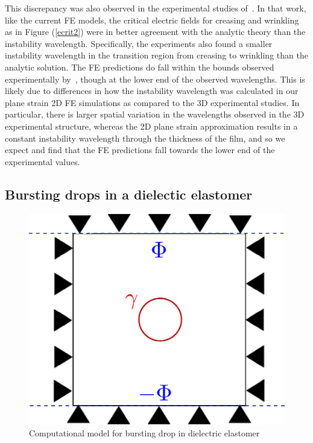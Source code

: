 \documentclass[final,authoryear,3p,times]{elsarticle}
\begin{document}
This discrepancy was also observed in the experimental studies of~\citet{wangPRE2013}.  In that work, like the current FE models, the critical electric fields for creasing and wrinkling as in Figure (\ref{ecrit2}) were in better agreement with the analytic theory than the instability wavelength.  Specifically, the experiments also found a smaller instability wavelength in the transition region from creasing to wrinkling than the analytic solution.  The FE predictions do fall within the bounds observed experimentally by~\citet{wangPRE2013}, though at the lower end of the observed wavelengths.  This is likely due to differences in how the instability wavelength was calculated in our plane strain 2D FE simulations as compared to the 3D experimental studies.  In particular, there is larger spatial variation in the wavelengths observed in the 3D experimental structure, whereas the 2D plane strain approximation results in a constant instability wavelength through the thickness of the film, and so we expect and find that the FE predictions fall towards the lower end of the experimental values.

\subsection{Bursting drops in a dielectic elastomer}

\begin{figure} \begin{center} 
\includegraphics[scale=0.35]{pics/bursting2.pdf}
\caption{Computational model for bursting drop in dielectric elastomer} 
\label{burstingschematic} \end{center} \end{figure}
\end{document}
